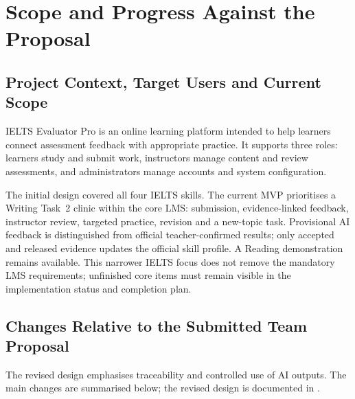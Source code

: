 
\section{Scope and Progress Against the Proposal}
\label{sec:scope}

\subsection{Project Context, Target Users and Current Scope}
IELTS Evaluator Pro is an online learning platform intended to help learners
connect assessment feedback with appropriate practice. It supports three
roles: learners study and submit work, instructors manage content and review
assessments, and administrators manage accounts and system configuration.

The initial design covered all four IELTS skills. The current MVP prioritises
a Writing Task~2 clinic within the core LMS: submission, evidence-linked
feedback, instructor review, targeted practice, revision and a new-topic task.
Provisional AI feedback is distinguished from official teacher-confirmed
results; only accepted and released evidence updates the official skill
profile. A Reading demonstration remains available. This narrower IELTS
focus does not remove the mandatory LMS requirements; unfinished core items
must remain visible in the implementation status and completion plan.

\subsection{Changes Relative to the Submitted Team Proposal}
The revised design emphasises traceability and controlled use of AI outputs.
The main changes are summarised below; the revised design is documented in
.

